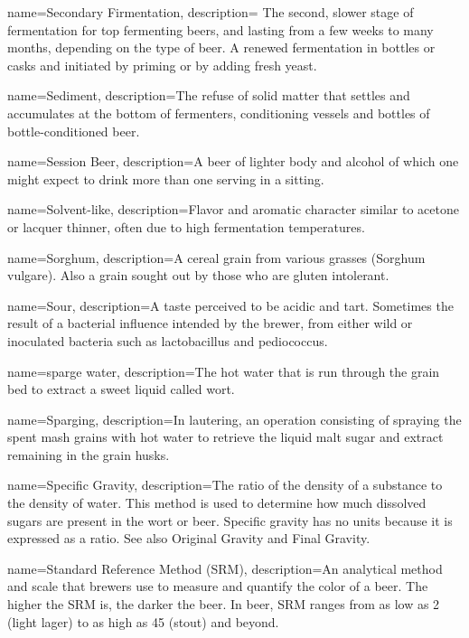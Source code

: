 {
  name={Secondary Firmentation},
  description={ The second, slower stage of fermentation for top fermenting beers, and lasting from a few weeks to many months, depending on the type of beer.  A renewed fermentation in bottles or casks and initiated by priming or by adding fresh yeast.  }
  }

{
  name={Sediment},
  description={The refuse of solid matter that settles and accumulates at the bottom of fermenters, conditioning vessels and bottles of bottle-conditioned beer.}
  }

{
  name={Session Beer},
  description={A beer of lighter body and alcohol of which one might expect to drink more than one serving in a sitting.}
  }

{
  name={Solvent-like},
  description={Flavor and aromatic character similar to acetone or lacquer thinner, often due to high fermentation temperatures.}
  }

{
  name={Sorghum},
  description={A cereal grain from various grasses (Sorghum vulgare). Also a grain sought out by those who are gluten intolerant.}
  }

{
  name={Sour},
  description={A taste perceived to be acidic and tart. Sometimes the result of a bacterial influence intended by the brewer, from either wild or inoculated bacteria such as lactobacillus and pediococcus.}
  }

{
  name={sparge water},
  description={The hot water that is run through the grain bed to extract a sweet liquid called wort.}
  }

{
  name={Sparging},
  description={In lautering, an operation consisting of spraying the spent mash grains with hot water to retrieve the liquid malt sugar and extract remaining in the grain husks.}
  }

{
  name={Specific Gravity},
  description={The ratio of the density of a substance to the density of water. This method is used to determine how much dissolved sugars are present in the wort or beer. Specific gravity has no units because it is expressed as a ratio. See also Original Gravity and Final Gravity.}
  }

{
  name={Standard Reference Method (SRM)},
  description={An analytical method and scale that brewers use to measure and quantify the color of a beer. The higher the SRM is, the darker the beer. In beer, SRM ranges from as low as 2 (light lager) to as high as 45 (stout) and beyond.}
  }

